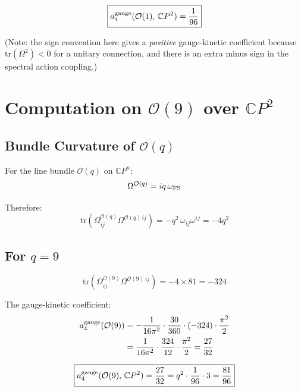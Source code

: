\documentclass[12pt,a4paper]{article}
\theoremstyle{definition}
\begin{document}
\begin{equation}
\boxed{a_4^{\rm gauge}(\mathcal{O}(1),\,\mathbb{C}P^2) = \frac{1}{96}}
\end{equation}

(Note: the sign convention here gives a \emph{positive} gauge-kinetic
coefficient because $\mathrm{tr}(\Omega^2) < 0$ for a unitary connection,
and there is an extra minus sign in the spectral action coupling.)

\section{Computation on $\mathcal{O}(9)$ over $\mathbb{C}P^2$}
\label{sec:O9}

\subsection{Bundle Curvature of $\mathcal{O}(q)$}

For the line bundle $\mathcal{O}(q)$ on $\mathbb{C}P^n$:
\begin{equation}
\Omega^{\mathcal{O}(q)} = iq\,\omega_{\rm FS}
\end{equation}

Therefore:
\begin{equation}
\mathrm{tr}(\Omega^{\mathcal{O}(q)}_{ij}\Omega^{\mathcal{O}(q)\,ij})
= -q^2\,\omega_{ij}\omega^{ij} = -4q^2
\end{equation}

\subsection{For $q = 9$}

\begin{equation}
\mathrm{tr}(\Omega^{\mathcal{O}(9)}_{ij}\Omega^{\mathcal{O}(9)\,ij})
= -4 \times 81 = -324
\end{equation}

The gauge-kinetic coefficient:
\begin{align}
a_4^{\rm gauge}(\mathcal{O}(9))
&= -\frac{1}{16\pi^2}\cdot\frac{30}{360}\cdot(-324)\cdot\frac{\pi^2}{2}
\nonumber\\
&= \frac{1}{16\pi^2}\cdot\frac{324}{12}\cdot\frac{\pi^2}{2}
= \frac{27}{32}
\end{align}

\begin{equation}
\boxed{a_4^{\rm gauge}(\mathcal{O}(9),\,\mathbb{C}P^2)
= \frac{27}{32} = q^2 \cdot \frac{1}{96} \cdot 3 = \frac{81}{96}}
\end{equation}
\end{document}
